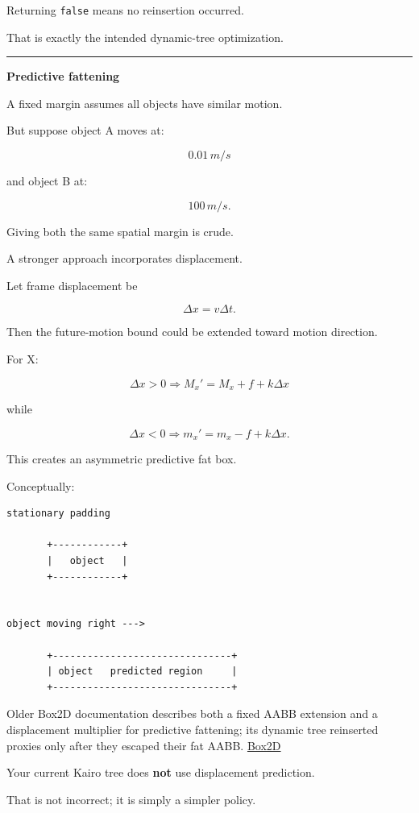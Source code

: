 Returning \texttt{false} means no reinsertion occurred.

That is exactly the intended dynamic-tree optimization.

\begin{center}\rule{0.5\linewidth}{0.5pt}\end{center}

\textbf{Predictive fattening}

A fixed margin assumes all objects have similar motion.

But suppose object A moves at:

\[
0.01\,m/s
\]

and object B at:

\[
100\,m/s.
\]

Giving both the same spatial margin is crude.

A stronger approach incorporates displacement.

Let frame displacement be

\[
\Delta x=v\Delta t.
\]

Then the future-motion bound could be extended toward motion direction.

For X:

\[
\Delta x>0
\Rightarrow
M_x'=M_x+f+k\Delta x
\]

while

\[
\Delta x<0
\Rightarrow
m_x'=m_x-f+k\Delta x.
\]

This creates an asymmetric predictive fat box.

Conceptually:

\begin{verbatim}
stationary padding

       +------------+
       |   object   |
       +------------+


object moving right --->

       +-------------------------------+
       | object   predicted region     |
       +-------------------------------+
\end{verbatim}

Older Box2D documentation describes both a fixed AABB extension and a displacement multiplier for predictive fattening; its dynamic tree reinserted proxies only after they escaped their fat AABB. \href{https://box2d.org/doc_version_2_4/classb2_dynamic_tree.html?utm_source=chatgpt.com}{Box2D}

Your current Kairo tree does \textbf{not} use displacement prediction.

That is not incorrect; it is simply a simpler policy.

